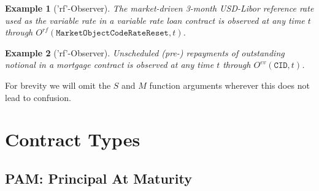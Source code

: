 \documentclass[9pt,oneside]{amsart}
\newtheorem{example}{Example}
\newcommand{\attr}[1]{\texttt{#1}}
\newcommand{\obs}[3]{O^{#1}(#2,#3)}
\begin{document}
\begin{multicols}{2}
\begin{example}['rf'-Observer] The market-driven 3-month USD-Libor reference rate used as the variable rate in a variable rate loan contract is observed at any time $t$ through $\obs{rf}{\attr{MarketObjectCodeRateReset}}{t}$.
\end{example}

\begin{example}['rf'-Observer] Unscheduled (pre-) repayments of outstanding notional in a mortgage contract is observed at any time $t$ through $\obs{ev}{\attr{CID}}{t}$.
\end{example}

For brevity we will omit the $S$ and $M$ function arguments wherever this does not lead to confusion.




\end{multicols}
\newpage




\section{Contract Types}


\subsection{PAM: Principal At Maturity}\label{sec:pam}


\end{document}

